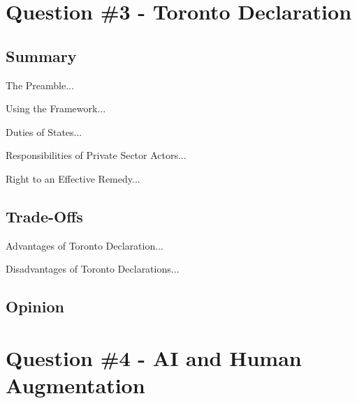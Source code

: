 \documentclass[
	letterpaper, %
]{jdf}
\begin{document}
\section{Question \#3 - Toronto Declaration}
\subsection{Summary}
The Preamble...

Using the Framework...

Duties of States...

Responsibilities of Private Sector Actors...

Right to an Effective Remedy...
\subsection{Trade-Offs}
Advantages of Toronto Declaration...

Disadvantages of Toronto Declarations...
\subsection{Opinion}

\section{Question \#4 - AI and Human Augmentation}

\end{document}
